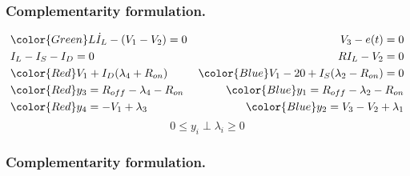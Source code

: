  \frame
{
\frametitle{Complementarity formulation.}

\begin{figure}
   \centerline{
   \scalebox{0.8}{
    
    }
 } 
 \end{figure}

  
 \begin{eqnarray*}
 &{\color{Green}L\dot I_L -(V_1-V_2)=0}&V_3-e(t)=0\\
 &I_L-I_S-I_D=0&RI_L-V_2=0\\
 &{\color{Red}V_1+I_D(\lambda _4 +R_{on})}&{\color{Blue}V_1-20+I_S(\lambda _2 - R_{on})=0}\\
 &{\color{Red}y_3=R_{off}-\lambda _4 - R_{on}}&{\color{Blue}y_1=R_{off}-\lambda _2-R_{on}}\\
 &{\color{Red}y_4=-V_1+\lambda _3}&{\color{Blue}y_2=V_3-V_2+\lambda _1}\\
 \end{eqnarray*}
 \[0 \leq y_i \perp \lambda _i \geq 0\]
 }

\frame
{

\frametitle{Complementarity formulation.}
 \begin{figure}
   
 \end{figure}

 }
